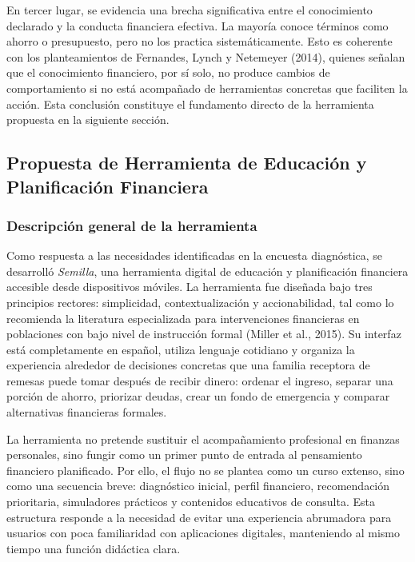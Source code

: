 \documentclass[12pt,letterpaper]{article}
\begin{document}
En tercer lugar, se evidencia una brecha significativa entre el conocimiento declarado y la conducta financiera efectiva. La mayoría conoce términos como ahorro o presupuesto, pero no los practica sistemáticamente. Esto es coherente con los planteamientos de Fernandes, Lynch y Netemeyer (2014), quienes señalan que el conocimiento financiero, por sí solo, no produce cambios de comportamiento si no está acompañado de herramientas concretas que faciliten la acción. Esta conclusión constituye el fundamento directo de la herramienta propuesta en la siguiente sección.

\subsection{\texorpdfstring{\textbf{Propuesta de Herramienta de Educación y Planificación Financiera}}{Propuesta de Herramienta de Educación y Planificación Financiera}}\label{propuesta-de-herramienta-de-educaciuxf3n-y-planificaciuxf3n-financiera}

\subsubsection{\texorpdfstring{\textbf{Descripción general de la herramienta}}{Descripción general de la herramienta}}\label{descripciuxf3n-general-de-la-herramienta}

Como respuesta a las necesidades identificadas en la encuesta diagnóstica, se desarrolló \textit{Semilla}, una herramienta digital de educación y planificación financiera accesible desde dispositivos móviles. La herramienta fue diseñada bajo tres principios rectores: simplicidad, contextualización y accionabilidad, tal como lo recomienda la literatura especializada para intervenciones financieras en poblaciones con bajo nivel de instrucción formal (Miller et al., 2015). Su interfaz está completamente en español, utiliza lenguaje cotidiano y organiza la experiencia alrededor de decisiones concretas que una familia receptora de remesas puede tomar después de recibir dinero: ordenar el ingreso, separar una porción de ahorro, priorizar deudas, crear un fondo de emergencia y comparar alternativas financieras formales.

La herramienta no pretende sustituir el acompañamiento profesional en finanzas personales, sino fungir como un primer punto de entrada al pensamiento financiero planificado. Por ello, el flujo no se plantea como un curso extenso, sino como una secuencia breve: diagnóstico inicial, perfil financiero, recomendación prioritaria, simuladores prácticos y contenidos educativos de consulta. Esta estructura responde a la necesidad de evitar una experiencia abrumadora para usuarios con poca familiaridad con aplicaciones digitales, manteniendo al mismo tiempo una función didáctica clara.
\end{document}
